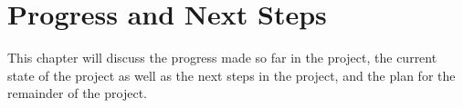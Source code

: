 \chapter{Progress and Next Steps}
\label{chap:progress-and-next-steps}
This chapter will discuss the progress made so far in the project, the current state of the project as well as the next steps in the project, and the plan for the remainder of the project.

\begingroup
\let\clearpage\relax




\endgroup